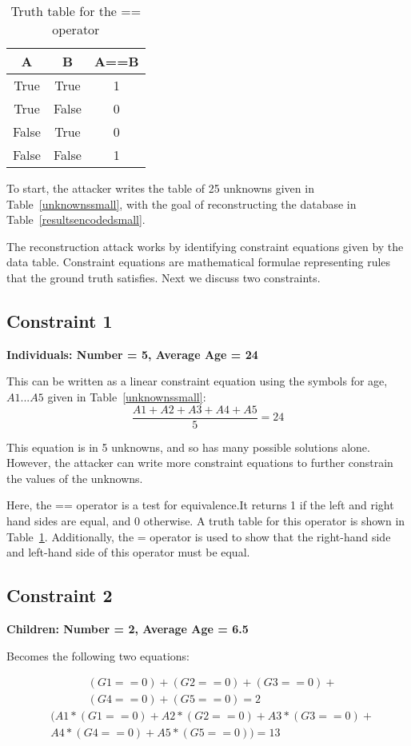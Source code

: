 \documentclass[5p,times,11pt]{elsarticle}
\begin{document}
\begin{table}[t]
\begin{tabular}{cc|c}
A & B & A==B  \\
\hline
True & True & 1   \\
True & False & 0  \\
False & True & 0  \\
False & False & 1  \\
\hline
\end{tabular}
\caption{Truth table for the == operator}\label{truthtable}
\end{table}


 To start, the attacker writes the table of 25 unknowns given in Table~\ref{unknownssmall}, with the goal of reconstructing the database in Table~\ref{resultsencodedsmall}.



The reconstruction attack works by identifying constraint
equations given by the data table. Constraint equations are  mathematical formulae representing rules that the ground truth satisfies. Next we discuss two constraints.
\subsection{Constraint 1}
\textbf{Individuals: Number = 5, Average Age = 24}


This can be written as a linear constraint equation using the symbols for age, $A1...A5$ given in Table~\ref{unknownssmall}:
\[\frac{A1 + A2 + A3 + A4 + A5}{5} = 24\]

This equation is in 5 unknowns, and so has many possible solutions alone.
However, the attacker can write more constraint equations to further constrain the values of the unknowns.

Here, the == operator is a test for equivalence.It returns 1 if the left and right hand sides are equal, and 0 otherwise. A truth table for this operator is shown in Table~\ref{truthtable}. Additionally, the = operator is used to show that the right-hand side and left-hand side of this operator must be equal.

\subsection{Constraint 2}
\textbf{Children: Number = 2, Average Age = 6.5}


Becomes the following two equations:

\begin{align*}
& (G1==0) + (G2==0) + (G3==0)+\\
& (G4==0)+  (G5==0) = 2
\end{align*}
\begin{align*}
& (A1 * (G1==0) + A2 * (G2==0) + A3 * (G3==0) +\\
& A4 * (G4==0) +  A5 * (G5==0)) = 13
\end{align*}
\end{document}
